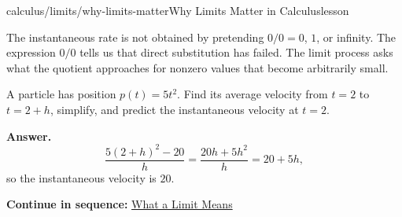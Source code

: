 \documentclass[11pt,openany]{book}
\theoremstyle{bgplain}
\newcommand{\webnext}[2]{%
  \par\addvspace{1.2em}\noindent{\color{BGLine}\rule{\textwidth}{0.35pt}}\par\smallskip
  {\small\color{BGGray}\textbf{Continue in sequence:} \hyperlink{web:#1}{#2}}\par
}
\begin{document}
\begin{webpage}{calculus/limits/why-limits-matter}{Why Limits Matter in Calculus}{lesson}
\begin{bgmistake}
The instantaneous rate is not obtained by pretending \(0/0=0\), \(1\), or infinity. The expression \(0/0\) tells us that direct substitution has failed. The limit process asks what the quotient approaches for nonzero values that become arbitrarily small.
\end{bgmistake}

\begin{bgquickcheck}
A particle has position \(p(t)=5t^2\). Find its average velocity from \(t=2\) to \(t=2+h\), simplify, and predict the instantaneous velocity at \(t=2\).

\textbf{Answer.}
\[
\frac{5(2+h)^2-20}{h}
=\frac{20h+5h^2}{h}
=20+5h,
\]
so the instantaneous velocity is \(20\).
\end{bgquickcheck}
\webnext{calculus/limits/what-a-limit-means}{What a Limit Means}
\end{webpage}
\end{document}
